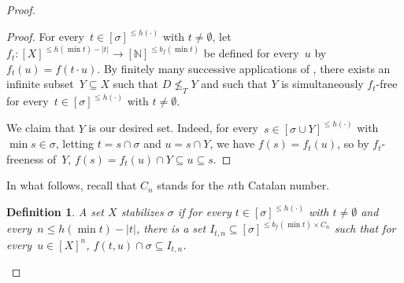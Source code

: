 \documentclass{article}
\newcommand{\NN}[0]{\mathbb{N}}
\numberwithin{theorem}{section}
\newtheorem{lemma}[theorem]{Lemma}
\newtheorem{definition}[theorem]{Definition}
\newcommand{\lorenzo}[1]{\textcolor{orange}{#1}}
\begin{document}
\begin{proof}
\begin{proof}
For every~$t \in [\sigma]^{\leq h(\cdot)}$ with $t \neq \emptyset$, let $f_t : [X]^{\leq h(\min t) - |t|} \to [\NN]^{\leq b_f(\min t)}$ be defined for every~$u$ by $f_t(u) = f(t \cdot u)$.
By finitely many successive applications of ,
there exists an infinite subset~$Y \subseteq X$ such that $D \not \leq_T Y$
and such that $Y$ is simultaneously $f_t$-free for every~$t \in [\sigma]^{\leq h(\cdot)}$ with $t \neq \emptyset$.

We claim that $Y$ is our desired set. Indeed, for every~$s \in [\sigma \cup Y]^{\leq h(\cdot)}$ with $\min s \in \sigma$, letting $t = s \cap \sigma$ and $u = s \cap Y$, we have $f(s) = f_t(u)$, so by $f_t$-freeness of~$Y$, $f(s) = f_t(u) \cap Y \subseteq u \subseteq s$.
\end{proof}

In what follows, recall that $C_n$ stands for the $n$th Catalan number.

\begin{definition}
A set $X$ \emph{stabilizes} $\sigma$ if for every $t \in [\sigma]^{\leq h(\cdot)}$ with $t \neq \emptyset$ and every~$n \leq h(\min t) - |t|$,
there is a set $I_{t,n} \subseteq [\sigma]^{\leq b_f(\min t) \times C_n}$ such that for every~$u \in [X]^n$,
$f(t, u) \cap \sigma \subseteq I_{t, n}$.
\end{definition}


\end{proof}
\end{document}
